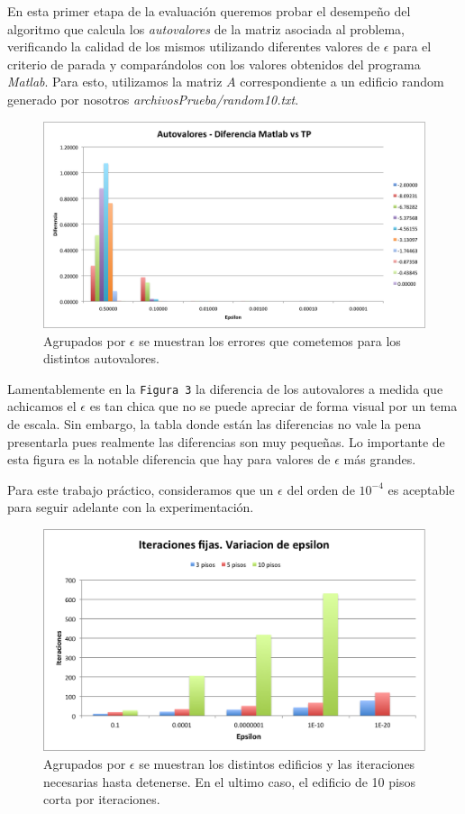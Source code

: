 \documentclass[a4paper]{article}
\begin{document}
En esta primer etapa de la evaluación queremos probar el desempeño del algoritmo que calcula los \textit{autovalores} de la matriz asociada al problema, verificando la calidad de los mismos utilizando diferentes valores de $\epsilon$ para el criterio de parada y comparándolos con los valores obtenidos del programa \textit{Matlab}. Para esto, utilizamos la matriz $A$ correspondiente a un edificio random generado por nosotros \textit{archivosPrueba/random10.txt}. 



\begin{figure}[H]
  \centering
  \includegraphics[scale=0.75]{graficos/3-Autovalores.png}
  \caption{Agrupados por $\epsilon$ se muestran los errores que cometemos para los distintos autovalores.}
\end{figure}

Lamentablemente en la \texttt{Figura 3} la diferencia de los autovalores a medida que achicamos el $\epsilon$ es tan chica que no se puede apreciar de forma visual por un tema de escala. Sin embargo, la tabla donde están las diferencias no vale la pena presentarla pues realmente las diferencias son muy pequeñas. Lo importante de esta figura es la notable diferencia que hay para valores de $\epsilon$ más grandes.

Para este trabajo práctico, consideramos que un $\epsilon$ del orden de $10^{-4}$ es aceptable para seguir adelante con la experimentación.


\begin{figure}[H]
  \centering
  \includegraphics[scale=0.75]{graficos/1-Cantidad_iteraciones_por_piso.png}
  \caption{Agrupados por $\epsilon$ se muestran los distintos edificios y las iteraciones necesarias hasta detenerse. En el ultimo caso, el edificio de 10 pisos corta por iteraciones.}
\end{figure}
\end{document}
